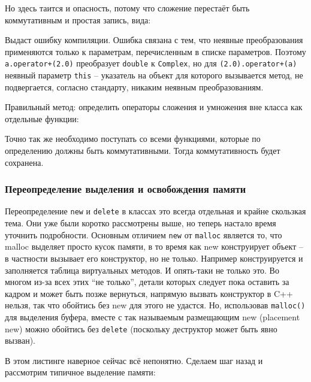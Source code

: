 \documentclass[a4paper,12pt,oneside]{article}
\begin{document}


Но здесь таится и опасность, потому что сложение перестаёт быть коммутативным и простая запись, вида:



Выдаст ошибку компиляции. Ошибка связана с тем, что неявные преобразования применяются только к параметрам, перечисленным в списке параметров. Поэтому \lstinline!a.operator+(2.0)! преобразует \lstinline!double! к \lstinline!Complex!, но для \lstinline!(2.0).operator+(a)! неявный параметр \lstinline!this! -- указатель на объект для которого вызывается метод, не подвергается, согласно стандарту, никаким неявным преобразованиям.

Правильный метод: определить операторы сложения и умножения вне класса как отдельные функции:



Точно так же необходимо поступать со всеми функциями, которые по определению должны быть коммутативными. Тогда коммутативность будет сохранена.

\subsubsection{Переопределение выделения и освобождения памяти}

Переопределение \lstinline!new! и \lstinline!delete! в классах это всегда отдельная и крайне скользкая тема. Они уже были коротко рассмотрены выше, но теперь настало время уточнить подробности. Основным отличием \lstinline!new! от \lstinline!malloc! является то, что malloc выделяет просто кусок памяти, в то время как new конструирует объект -- в частности вызывает его конструктор, но не только. Например конструируется и заполняется таблица виртуальных методов. И опять-таки не только это. Во многом из-за всех этих ``не только'', детали которых следует пока оставить за кадром и может быть позже вернуться, напрямую вызвать конструктор в C++ нельзя, так что обойтись без new для этого не удастся. Но, использовав \lstinline!malloc()! для выделения буфера, вместе с так называемым размещающим new (placement new) можно обойтись без \lstinline!delete! (поскольку деструктор может быть явно вызван).



В этом листинге наверное сейчас всё непонятно. Сделаем шаг назад и рассмотрим типичное выделение памяти:
\end{document}
